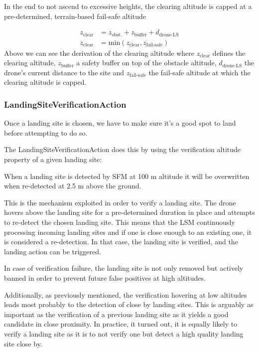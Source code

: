 In the end to not ascend to excessive heights, the clearing altitude is capped at a pre-determined, terrain-based fail-safe altitude

\begin{align}
    z_{\text{clear}} &= z_{\text{obst.}} + z_{\text{buffer}} + d_{\text{drone-LS}}\\
    z_{\text{clear}} &= \text{min}\left(z_{\text{clear}}, z_{\text{fail-safe}}\right)
\end{align}
Above we can see the derivation of the clearing altitude where $z_{\text{clear}}$ defines the clearing altitude, $z_{\text{buffer}}$ a safety buffer on top of the obstacle altitude, $d_{\text{drone-LS}}$ the drone's current distance to the site and $z_{\text{fail-safe}}$ the fail-safe altitude at which the clearing altitude is capped.

\subsubsection{LandingSiteVerificationAction}

Once a landing site is chosen, we have to make sure it's a good spot to land before attempting to do so. 

The LandingSiteVerificationAction does this by using the verification altitude property of a given landing site:

When a landing site is detected by SFM at 100 m altitude it will be overwritten when re-detected at 2.5 m above the ground. 

This is the mechanism exploited in order to verify a landing site. The drone hovers above the landing site for a pre-determined duration in place and attempts to re-detect the chosen landing site. This means that the LSM continuously processing incoming landing sites and if one is close enough to an existing one, it is considered a re-detection. In that case, the landing site is verified, and the landing action can be triggered.

In case of verification failure, the landing site is not only removed but actively banned in order to prevent future false positives at high altitudes.

Additionally, as previously mentioned, the verification hovering at low altitudes leads most probably to the detection of close by landing sites. This is arguably as important as the verification of a previous landing site as it yields a good candidate in close proximity. In practice, it turned out,  it is equally likely to verify a landing site as it is to not verify one but detect a high quality landing site close by.

